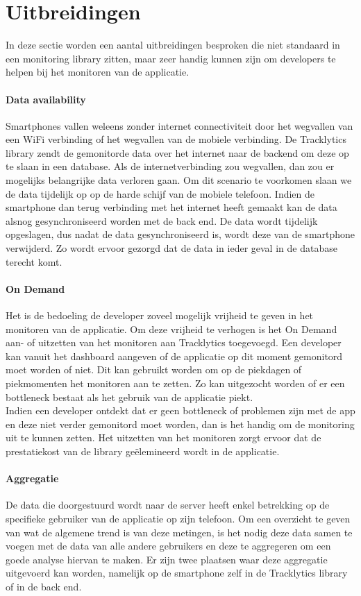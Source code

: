 \section{Uitbreidingen}
In deze sectie worden een aantal uitbreidingen besproken die niet standaard in een monitoring library zitten, maar zeer handig kunnen zijn om developers te helpen bij het monitoren van de applicatie.

\paragraph{Data availability}
Smartphones vallen weleens zonder internet connectiviteit door het wegvallen van een WiFi verbinding of het wegvallen van de mobiele verbinding. De Tracklytics library zendt de gemonitorde data over het internet naar de backend om deze op te slaan in een database. Als de internetverbinding zou wegvallen, dan zou er mogelijks belangrijke data verloren gaan. Om dit scenario te voorkomen slaan we de data tijdelijk op op de harde schijf van de mobiele telefoon. Indien de smartphone dan terug verbinding met het internet heeft gemaakt kan de data alsnog gesynchroniseerd worden met de back end. De data wordt tijdelijk opgeslagen, dus nadat de data gesynchroniseerd is, wordt deze van de smartphone verwijderd. Zo wordt ervoor gezorgd dat de data in ieder geval in de database terecht komt. 

\paragraph{On Demand}\label{par:OnDemand}
Het is de bedoeling de developer zoveel mogelijk vrijheid te geven in het monitoren van de applicatie. Om deze vrijheid te verhogen is het On Demand aan- of uitzetten van het monitoren aan Tracklytics toegevoegd. Een developer kan vanuit het dashboard aangeven of de applicatie op dit moment gemonitord moet worden of niet. Dit kan gebruikt worden om op de piekdagen of piekmomenten het monitoren aan te zetten. Zo kan uitgezocht worden of er een bottleneck bestaat als het gebruik van de applicatie piekt. \\
Indien een developer ontdekt dat er geen bottleneck of problemen zijn met de app en deze niet verder gemonitord moet worden, dan is het handig om de monitoring uit te kunnen zetten. Het uitzetten van het monitoren zorgt ervoor dat de prestatiekost van de library ge\"elemineerd wordt in de applicatie.


\paragraph{Aggregatie}\label{Arch:Aggregatie}
De data die doorgestuurd wordt naar de server heeft enkel betrekking op de specifieke gebruiker van de applicatie op zijn telefoon. Om een overzicht te geven van wat de algemene trend is van deze metingen, is het nodig deze data samen te voegen met de data van alle andere gebruikers en deze te aggregeren om een goede analyse hiervan te maken. Er zijn twee plaatsen waar deze aggregatie uitgevoerd kan worden, namelijk op de smartphone zelf in de Tracklytics library of in de back end. \\

